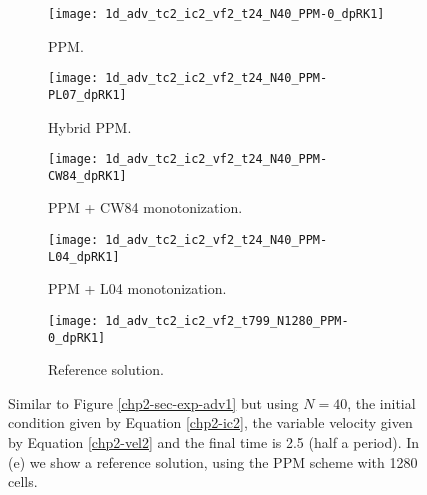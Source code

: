 \newpage

\begin{figure}[!htb]
  \centering
  \begin{subfigure}{0.49\textwidth}
    \centering
			\texttt{[image: 1d\_adv\_tc2\_ic2\_vf2\_t24\_N40\_PPM-0\_dpRK1]}
			\caption{PPM.\label{chp2-sec-exp-adv5-a}}
  \end{subfigure}
  \begin{subfigure}{0.49\textwidth}
    \centering
			\texttt{[image: 1d\_adv\_tc2\_ic2\_vf2\_t24\_N40\_PPM-PL07\_dpRK1]}
			\caption{Hybrid PPM.\label{chp2-sec-exp-adv5-b}}
  \end{subfigure}

  \begin{subfigure}{0.49\textwidth}
    \centering
		\texttt{[image: 1d\_adv\_tc2\_ic2\_vf2\_t24\_N40\_PPM-CW84\_dpRK1]}
    \caption{PPM + CW84 monotonization.\label{chp2-sec-exp-adv5-c}}
  \end{subfigure}
  \begin{subfigure}{0.49\textwidth}
    \centering
			\texttt{[image: 1d\_adv\_tc2\_ic2\_vf2\_t24\_N40\_PPM-L04\_dpRK1]}
      \caption{PPM + L04 monotonization.\label{chp2-sec-exp-adv5-d}}
  \end{subfigure} 

  \begin{subfigure}{0.49\textwidth}
    \centering
			\texttt{[image: 1d\_adv\_tc2\_ic2\_vf2\_t799\_N1280\_PPM-0\_dpRK1]}
      \caption{Reference solution.\label{chp2-sec-exp-adv5-e}}
  \end{subfigure} 
	\caption{ Similar to Figure \ref{chp2-sec-exp-adv1} but using $N=40$, 
	the initial condition given by Equation \eqref{chp2-ic2}, the variable velocity given by Equation
	\eqref{chp2-vel2} and the final time is 2.5 (half a period). In (e) we show a reference solution, using the PPM scheme with 
	1280 cells. \label{chp2-sec-exp-adv5}}
\end{figure}

\newpage


